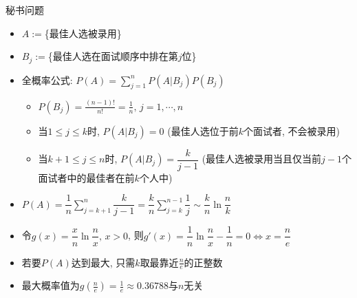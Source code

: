 \documentclass[Prob-All.tex]{subfiles}
\begin{document}
\begin{frame}{秘书问题}
		\begin{itemize}[<+-|alert@+>]
			\item $A:=$\{最佳人选被录用\}%
			\item$B_j:=$\{最佳人选在面试顺序中排在第$j$位\}
			\item 全概率公式: $P(A)=\sum\limits_{j=1}^{n}P(A|B_j)P(B_j)$%
			\begin{itemize}[<+-|alert@+>]
			\item $P(B_j)=\frac{(n-1)!}{n!}=\frac{1}{n},\,j=1,\cdots,n$
			\item 当$1\leq j\leq k$时, $P(A|B_j)=0$ \pause (最佳人选位于前$k$个面试者, 不会被录用)\pause
			\item 当$k+1\leq j\leq n$时, $P(A|B_j)=\dfrac{k}{j-1}$ (最佳人选被录用当且仅当前$j-1$个面试者中的最佳者在前$k$个人中)
			\end{itemize}
			\item $P(A)=\dfrac{1}{n}\sum\limits_{j=k+1}^{n}\dfrac{k}{j-1}=\dfrac{k}{n}\sum\limits_{j=k}^{n-1}\dfrac{1}{j}\sim\dfrac{k}{n}\ln\dfrac{n}{k}$
			\item 令$g(x)=\dfrac{x}{n}\ln\dfrac{n}{x},\,x>0$, 则$g'(x)=\dfrac{1}{n}\ln\dfrac{n}{x}-\dfrac{1}{n}=0\Longleftrightarrow x=\dfrac{n}{e}$
			\item 若要$P(A)$达到最大, 只需$k$取最靠近$\frac{n}{e}$的正整数
			\item 最大概率值为$g\left(\frac{n}{e}\right)=\frac{1}{e}\approx 0.36788$与$n$无关
		\end{itemize}
\end{frame}










\end{document}
